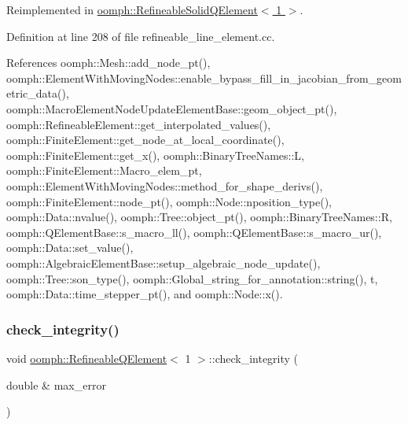 Reimplemented in \hyperlink{classoomph_1_1RefineableSolidQElement_3_011_01_4_a6b534dd58082904153161cba4034b62f}{oomph\+::\+Refineable\+Solid\+Q\+Element$<$ 1 $>$}.



Definition at line 208 of file refineable\+\_\+line\+\_\+element.\+cc.



References oomph\+::\+Mesh\+::add\+\_\+node\+\_\+pt(), oomph\+::\+Element\+With\+Moving\+Nodes\+::enable\+\_\+bypass\+\_\+fill\+\_\+in\+\_\+jacobian\+\_\+from\+\_\+geometric\+\_\+data(), oomph\+::\+Macro\+Element\+Node\+Update\+Element\+Base\+::geom\+\_\+object\+\_\+pt(), oomph\+::\+Refineable\+Element\+::get\+\_\+interpolated\+\_\+values(), oomph\+::\+Finite\+Element\+::get\+\_\+node\+\_\+at\+\_\+local\+\_\+coordinate(), oomph\+::\+Finite\+Element\+::get\+\_\+x(), oomph\+::\+Binary\+Tree\+Names\+::L, oomph\+::\+Finite\+Element\+::\+Macro\+\_\+elem\+\_\+pt, oomph\+::\+Element\+With\+Moving\+Nodes\+::method\+\_\+for\+\_\+shape\+\_\+derivs(), oomph\+::\+Finite\+Element\+::node\+\_\+pt(), oomph\+::\+Node\+::nposition\+\_\+type(), oomph\+::\+Data\+::nvalue(), oomph\+::\+Tree\+::object\+\_\+pt(), oomph\+::\+Binary\+Tree\+Names\+::R, oomph\+::\+Q\+Element\+Base\+::s\+\_\+macro\+\_\+ll(), oomph\+::\+Q\+Element\+Base\+::s\+\_\+macro\+\_\+ur(), oomph\+::\+Data\+::set\+\_\+value(), oomph\+::\+Algebraic\+Element\+Base\+::setup\+\_\+algebraic\+\_\+node\+\_\+update(), oomph\+::\+Tree\+::son\+\_\+type(), oomph\+::\+Global\+\_\+string\+\_\+for\+\_\+annotation\+::string(), t, oomph\+::\+Data\+::time\+\_\+stepper\+\_\+pt(), and oomph\+::\+Node\+::x().

\mbox{\label{classoomph_1_1RefineableQElement_3_011_01_4_a64d91c3deb6f1c7532b77f9e673bb150}} 
\subsubsection{\texorpdfstring{check\+\_\+integrity()}{check\_integrity()}}
{\footnotesize\ttfamily void \hyperlink{classoomph_1_1RefineableQElement}{oomph\+::\+Refineable\+Q\+Element}$<$ 1 $>$\+::check\+\_\+integrity (\begin{DoxyParamCaption}\item[{double \&}]{max\+\_\+error }\end{DoxyParamCaption})\hspace{0.3cm}{\ttfamily [virtual]}}




